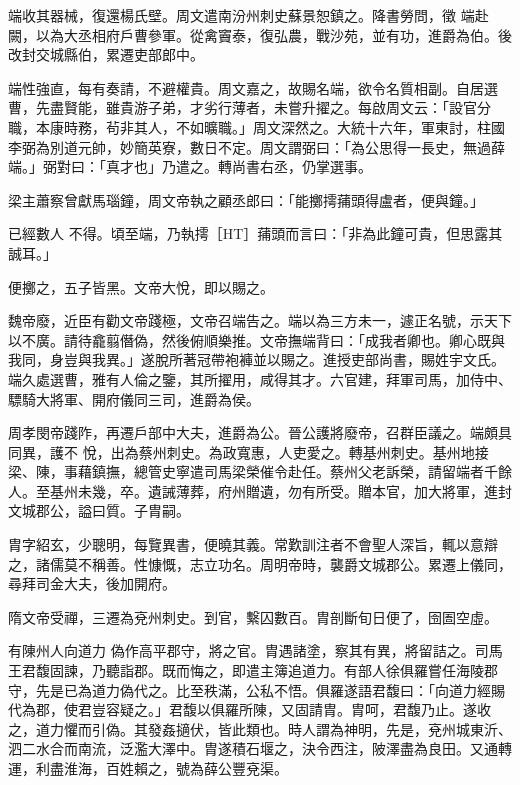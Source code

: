 \begin{pinyinscope}
 端收其器械，復還楊氏壁。周文遣南汾州刺史蘇景恕鎮之。降書勞問，徵
 端赴闕，以為大丞相府戶曹參軍。從禽竇泰，復弘農，戰沙苑，並有功，進爵為伯。後改封交城縣伯，累遷吏部郎中。



 端性強直，每有奏請，不避權貴。周文嘉之，故賜名端，欲令名質相副。自居選曹，先盡賢能，雖貴游子弟，才劣行薄者，未嘗升擢之。每啟周文云：「設官分職，本康時務，茍非其人，不如曠職。」周文深然之。大統十六年，軍東討，柱國李弼為別道元帥，妙簡英寮，數日不定。周文謂弼曰：「為公思得一長史，無過薛端。」弼對曰：「真才也」乃遣之。轉尚書右丞，仍掌選事。



 梁主蕭察曾獻馬瑙鐘，周文帝執之顧丞郎曰：「能擲摴蒱頭得盧者，便與鐘。」



 已經數人
 不得。頃至端，乃執摴［HT］蒱頭而言曰：「非為此鐘可貴，但思露其誠耳。」



 便擲之，五子皆黑。文帝大悅，即以賜之。



 魏帝廢，近臣有勸文帝踐極，文帝召端告之。端以為三方未一，遽正名號，示天下以不廣。請待龕翦僭偽，然後俯順樂推。文帝撫端背曰：「成我者卿也。卿心既與我同，身豈與我異。」遂脫所著冠帶袍褲並以賜之。進授吏部尚書，賜姓宇文氏。端久處選曹，雅有人倫之鑒，其所擢用，咸得其才。六官建，拜軍司馬，加侍中、驃騎大將軍、開府儀同三司，進爵為侯。



 周孝閔帝踐阼，再遷戶部中大夫，進爵為公。晉公護將廢帝，召群臣議之。端頗具同異，護不
 悅，出為蔡州刺史。為政寬惠，人吏愛之。轉基州刺史。基州地接梁、陳，事藉鎮撫，總管史寧遣司馬梁榮催令赴任。蔡州父老訴榮，請留端者千餘人。至基州未幾，卒。遺誡薄葬，府州贈遺，勿有所受。贈本官，加大將軍，進封文城郡公，謚曰質。子胄嗣。



 胄字紹玄，少聰明，每覽異書，便曉其義。常歎訓注者不會聖人深旨，輒以意辯之，諸儒莫不稱善。性慷慨，志立功名。周明帝時，襲爵文城郡公。累遷上儀同，尋拜司金大夫，後加開府。



 隋文帝受禪，三遷為兗州刺史。到官，繫囚數百。胄剖斷旬日便了，囹圄空虛。



 有陳州人向道力
 偽作高平郡守，將之官。胄遇諸塗，察其有異，將留詰之。司馬王君馥固諫，乃聽詣郡。既而悔之，即遣主簿追道力。有部人徐俱羅嘗任海陵郡守，先是已為道力偽代之。比至秩滿，公私不悟。俱羅遂語君馥曰：「向道力經賜代為郡，使君豈容疑之。」君馥以俱羅所陳，又固請胄。胄呵，君馥乃止。遂收之，道力懼而引偽。其發姦擿伏，皆此類也。時人謂為神明，先是，兗州城東沂、泗二水合而南流，泛濫大澤中。胄遂積石堰之，決令西注，陂澤盡為良田。又通轉運，利盡淮海，百姓賴之，號為薛公豐兗渠。




\end{pinyinscope}
